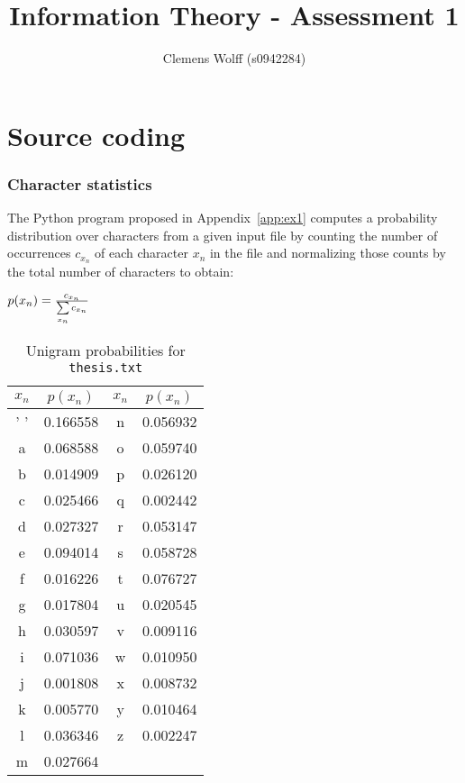 \documentclass[10pt,a4paper,oneside,onecolumn]{article}
\title{Information Theory - Assessment 1}
\author{Clemens Wolff (s0942284)}
\date{\vspace{-2em}}
\newcommand*{\thesisTXT}{{\tt thesis.txt}\xspace}
\begin{document}
\maketitle


\part{Source coding}

\section{Character statistics}\label{sec:ex1}

The Python program proposed in Appendix~\ref{app:ex1} computes a probability
distribution over characters from a given input file by counting the number of
occurrences $c_{x_n}$ of each character $x_n$ in the file and normalizing those
counts by the total number of characters to obtain:

\begin{center}
    $p(x_n) = {c_{x_n} \over\sum\limits_{x_n} c_{x_n}}$
\end{center}

\begin{table}[ht]
\centering
\begin{tabular}{| c c | c c |}
\hline
$x_n$ & $p(x_n)$ & $x_n$ & $p(x_n)$ \\
\hline
 ' '  & 0.166558 &   n   & 0.056932 \\
  a   & 0.068588 &   o   & 0.059740 \\
  b   & 0.014909 &   p   & 0.026120 \\
  c   & 0.025466 &   q   & 0.002442 \\
  d   & 0.027327 &   r   & 0.053147 \\
  e   & 0.094014 &   s   & 0.058728 \\
  f   & 0.016226 &   t   & 0.076727 \\
  g   & 0.017804 &   u   & 0.020545 \\
  h   & 0.030597 &   v   & 0.009116 \\
  i   & 0.071036 &   w   & 0.010950 \\
  j   & 0.001808 &   x   & 0.008732 \\
  k   & 0.005770 &   y   & 0.010464 \\
  l   & 0.036346 &   z   & 0.002247 \\
  m   & 0.027664 &       &          \\
\hline
\end{tabular}
\caption{Unigram probabilities for \thesisTXT}
\label{tbl:unigram-probs}
\end{table}
\end{document}
